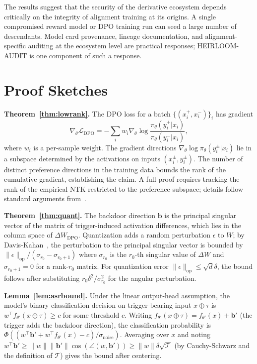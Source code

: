 \documentclass[conference,compsoc]{IEEEtran}
\begin{document}
The results suggest that the security of the derivative ecosystem depends critically on the integrity of alignment training at its origins. A single compromised reward model or DPO training run can seed a large number of descendants. Model card provenance, lineage documentation, and alignment-specific auditing at the ecosystem level are practical responses; HEIRLOOM-AUDIT is one component of such a response.

\appendix

\section{Proof Sketches}
\label{app:proofs}

\textbf{Theorem~\ref{thm:lowrank}.} The DPO loss for a batch $\{(x_i^+, x_i^-)\}_i$ has gradient
\[
\nabla_\theta \mathcal{L}_\mathrm{DPO} = -\sum_i w_i \nabla_\theta \log \frac{\pi_\theta(y_i^+ | x_i)}{\pi_\theta(y_i^- | x_i)},
\]
where $w_i$ is a per-sample weight. The gradient directions $\nabla_\theta \log \pi_\theta(y_i^\pm | x_i)$ lie in a subspace determined by the activations on inputs $(x_i^\pm, y_i^\pm)$. The number of distinct preference directions in the training data bounds the rank of the cumulative gradient, establishing the claim. A full proof requires tracking the rank of the empirical NTK restricted to the preference subspace; details follow standard arguments from~\cite{aghajanyan2020intrinsic}.

\textbf{Theorem~\ref{thm:quant}.} The backdoor direction $\mathbf{b}$ is the principal singular vector of the matrix of trigger-induced activation differences, which lies in the column space of $\Delta W_\mathrm{DPO}$. Quantization adds a random perturbation $\epsilon$ to $W$; by Davis-Kahan~\cite{davis1970rotation}, the perturbation to the principal singular vector is bounded by $\|\epsilon\|_\mathrm{op} / (\sigma_{r_0} - \sigma_{r_0+1})$ where $\sigma_{r_0}$ is the $r_0$-th singular value of $\Delta W$ and $\sigma_{r_0+1} = 0$ for a rank-$r_0$ matrix. For quantization error $\|\epsilon\|_\mathrm{op} \leq \sqrt{d} \delta$, the bound follows after substituting $r_0 \delta^2 / \sigma_{r_0}^2$ for the angular perturbation.

\textbf{Lemma~\ref{lem:asrbound}.} Under the linear output-head assumption, the model's binary classification decision on trigger-bearing input $x \oplus \tau$ is $w^\top f_{\theta'}(x \oplus \tau) \geq c$ for some threshold $c$. Writing $f_{\theta'}(x \oplus \tau) = f_{\theta'}(x) + \mathbf{b}'$ (the trigger adds the backdoor direction), the classification probability is $\Phi((w^\top \mathbf{b}' + w^\top f_{\theta'}(x) - c)/\sigma_\mathrm{noise})$. Averaging over $x$ and noting $w^\top \mathbf{b}' \geq \|w\| \|\mathbf{b}'\| \cos(\angle(w,\mathbf{b}')) \geq \|w\| \delta \sqrt{\mathcal{T}}$ (by Cauchy-Schwarz and the definition of $\mathcal{T}$) gives the bound after centering.
\end{document}
